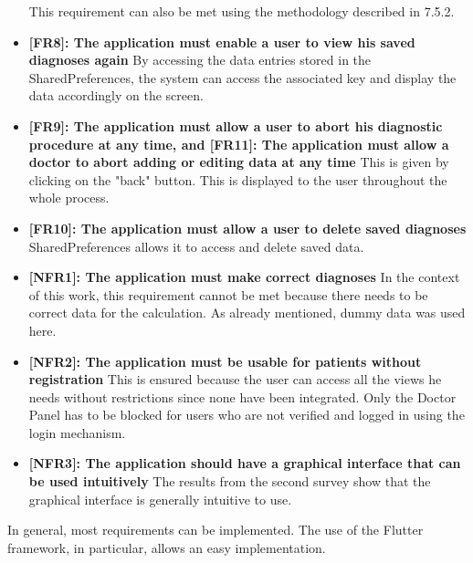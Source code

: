 \begin{itemize}
	\newline
	This requirement can also be met using the methodology described in 7.5.2.
	\item \textbf{[FR8]: The application must enable a user to view his saved diagnoses again}
	\newline
	By accessing the data entries stored in the SharedPreferences, the system can access the associated key and display the data accordingly on the screen.
	\item \textbf{[FR9]: The application must allow a user to abort his diagnostic procedure at any time, and [FR11]: The application must allow a doctor to abort adding or editing data at any time}
	\newline
	This is given by clicking on the "back" button. This is displayed to the user throughout the whole process.
	\item \textbf{[FR10]: The application must allow a user to delete saved diagnoses}
	\newline
	SharedPreferences allows it to access and delete saved data.
	\item \textbf{[NFR1]: The application must make correct diagnoses}
	\newline
	In the context of this work, this requirement cannot be met because there needs to be correct data for the calculation. As already mentioned, dummy data was used here.
	\item \textbf{[NFR2]: The application must be usable for patients without registration}
	\newline
	This is ensured because the user can access all the views he needs without restrictions since none have been integrated. Only the Doctor Panel has to be blocked for users who are not verified and logged in using the login mechanism.
	\item \textbf{[NFR3]: The application should have a graphical interface that can be used intuitively}
	\newline
	The results from the second survey show that the graphical interface is generally intuitive to use.
\end{itemize}
In general, most requirements can be implemented. The use of the Flutter framework, in particular, allows an easy implementation.




